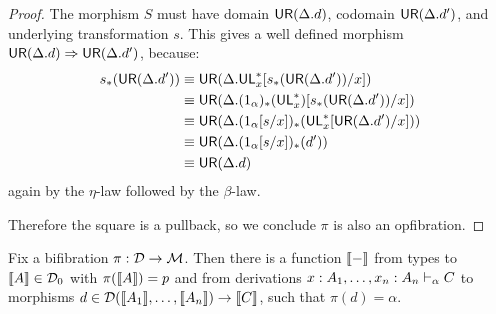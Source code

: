 \begin{proof}
The morphism $S$ must have domain $\mathsf{UR}(\Delta.d)$, codomain $\mathsf{UR}(\Delta.d')$, and underlying transformation $s$. This gives a well defined morphism $\mathsf{UR}(\Delta.d) \Rightarrow \mathsf{UR}(\Delta.d')$, because:
\begin{align*}
s_*(\mathsf{UR}(\Delta.d')) 
&\equiv \mathsf{UR}(\Delta.\mathsf{UL}^*_{x}[s_*(\mathsf{UR}(\Delta.d'))/x])\\
&\equiv \mathsf{UR}(\Delta.(1_\alpha)_*(\mathsf{UL}^*_{x})[s_*(\mathsf{UR}(\Delta.d'))/x])\\
&\equiv \mathsf{UR}(\Delta.(1_\alpha[s/x])_*(\mathsf{UL}^*_{x}[\mathsf{UR}(\Delta.d')/x]))\\
&\equiv \mathsf{UR}(\Delta.(1_\alpha[s/x])_*(d'))\\
&\equiv \mathsf{UR}(\Delta.d)
\end{align*}
again by the $\eta$-law followed by the $\beta$-law.

Therefore the square is a pullback, so we conclude $\pi$ is also an opfibration.
\end{proof}

\begin{theorem}
Fix a bifibration $\pi : \mathcal{D} \to \mathcal{M}$.  Then there is a function $\llbracket -
\rrbracket$ from types  to $\llbracket A \rrbracket \in \mathcal{D}_0$ with $\pi(\llbracket
A \rrbracket) = p$ and from derivations $x:A_1, \ldots,
  x_n:A_n \vdash_{\alpha} C$ to morphisms $d \in \mathcal{D}(\llbracket A_1 \rrbracket, \dots, \llbracket
A_n \rrbracket) \to \llbracket C \rrbracket$, such that $\pi(d) = \alpha$.
\end{theorem}


